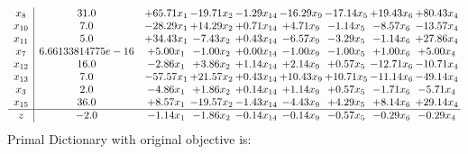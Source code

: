 \documentclass[9pt]{article}
\begin{document}
\[\begin{array}{c| c c@{\hskip 2pt} c@{\hskip 2pt} c@{\hskip 2pt} c@{\hskip 2pt} c@{\hskip 2pt} c@{\hskip 2pt} c@{\hskip 2pt} }
 x_{8}   &  31.0 & + 65.71 x_{1} & -19.71 x_{2} & -1.29 x_{14} & -16.29 x_{9} & -17.14 x_{5} & + 19.43 x_{6} & + 80.43 x_{4}\\
 x_{10}   &  7.0 & -28.29 x_{1} & + 14.29 x_{2} & +  0.71 x_{14} & +  4.71 x_{9} & -1.14 x_{5} & -8.57 x_{6} & -13.57 x_{4}\\
 x_{11}   &  5.0 & + 34.43 x_{1} & -7.43 x_{2} & +  0.43 x_{14} & -6.57 x_{9} & -3.29 x_{5} & -1.14 x_{6} & + 27.86 x_{4}\\
 x_{7}   &  6.66133814775e-16 & +  5.00 x_{1} & -1.00 x_{2} & +  0.00 x_{14} & -1.00 x_{9} & -1.00 x_{5} & +  1.00 x_{6} & +  5.00 x_{4}\\
 x_{12}   &  16.0 & -2.86 x_{1} & +  3.86 x_{2} & +  1.14 x_{14} & +  2.14 x_{9} & +  0.57 x_{5} & -12.71 x_{6} & -10.71 x_{4}\\
 x_{13}   &  7.0 & -57.57 x_{1} & + 21.57 x_{2} & +  0.43 x_{14} & + 10.43 x_{9} & + 10.71 x_{5} & -11.14 x_{6} & -49.14 x_{4}\\
 x_{3}   &  2.0 & -4.86 x_{1} & +  1.86 x_{2} & +  0.14 x_{14} & +  1.14 x_{9} & +  0.57 x_{5} & -1.71 x_{6} & -5.71 x_{4}\\
 x_{15}   &  36.0 & +  8.57 x_{1} & -19.57 x_{2} & -1.43 x_{14} & -4.43 x_{9} & +  4.29 x_{5} & +  8.14 x_{6} & + 29.14 x_{4}\\
\hline
z    &  -2.0 & -1.14 x_{1} & -1.86 x_{2} & -0.14 x_{14} & -0.14 x_{9} & -0.57 x_{5} & -0.29 x_{6} & -0.29 x_{4}\\
\end{array}\]
Primal Dictionary with original objective is:
\end{document}
